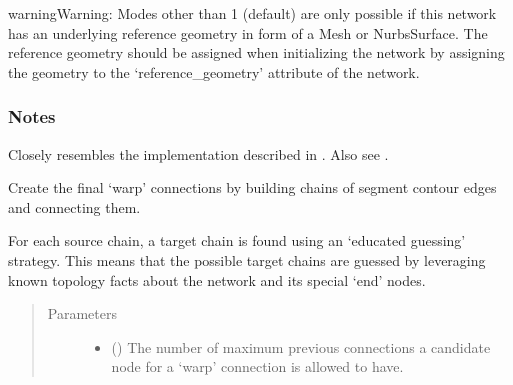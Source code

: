 \documentclass[letterpaper,10pt,english]{sphinxmanual}
\begin{document}
\begin{fulllineitems}
\begin{fulllineitems}
\begin{quote}
\begin{description}
\end{description}\end{quote}

\begin{sphinxadmonition}{warning}{Warning:}
Modes other than \sphinxhyphen{}1 (default) are only possible if this network has an
underlying reference geometry in form of a Mesh or NurbsSurface. The
reference geometry  should be assigned when initializing the network by
assigning the geometry to the ‘reference\_geometry’ attribute of the
network.
\end{sphinxadmonition}
\subsubsection*{Notes}

Closely resembles the implementation described in  \sphinxfootnotemark[1]. Also see
 \sphinxfootnotemark[2].

\end{fulllineitems}


\begin{fulllineitems}
\label{\detokenize{cockatoo:cockatoo.KnitNetwork.create_final_warp_connections}}
Create the final ‘warp’ connections by building chains of segment
contour edges and connecting them.

For each source chain, a target chain is found using an
‘educated guessing’ strategy. This means that the possible target
chains are guessed by leveraging known topology facts about the network
and its special ‘end’ nodes.
\begin{quote}\begin{description}
\item[{Parameters}] \leavevmode\begin{itemize}
\item {} 
 (\sphinxstyleliteralemphasis{\sphinxupquote{, }}) \textendash{} 
The number of maximum previous connections a candidate node for a
‘warp’ connection is allowed to have.


\end{itemize}
\end{description}
\end{quote}
\end{fulllineitems}
\end{fulllineitems}
\end{document}
